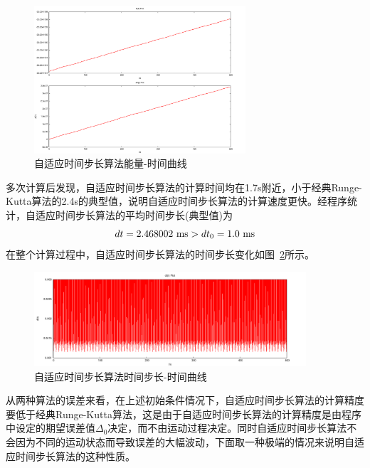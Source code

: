\documentclass[a4paper,12pt,titlepage]{article}
\begin{document}
\begin{figure}[H]
\centering
\includegraphics[width=0.7\textwidth]{./RKAE_3.pdf}
\caption[Caption for LOF]{自适应时间步长算法能量-时间曲线}
\label{fig:RKAE_3}
\end{figure}

多次计算后发现，自适应时间步长算法的计算时间均在1.7s附近，小于经典Runge-Kutta算法的2.4s的典型值，说明自适应时间步长算法的计算速度更快。经程序统计，自适应时间步长算法的平均时间步长(典型值)为
\begin{equation}
	dt=2.468002 ~\mathrm{ms} > dt_0=1.0 ~\mathrm{ms}\notag
\end{equation}
在整个计算过程中，自适应时间步长算法的时间步长变化如图~\ref{fig:RKAdt_3}所示。
\begin{figure}[H]
\centering
\includegraphics[width=0.9\textwidth]{./RKAdt_3.pdf}
\caption[Caption for LOF]{自适应时间步长算法时间步长-时间曲线}
\label{fig:RKAdt_3}
\end{figure}

从两种算法的误差来看，在上述初始条件情况下，自适应时间步长算法的计算精度要低于经典Runge-Kutta算法，这是由于自适应时间步长算法的计算精度是由程序中设定的期望误差值$\Delta_0$决定，而不由运动过程决定。同时自适应时间步长算法不会因为不同的运动状态而导致误差的大幅波动，下面取一种极端的情况来说明自适应时间步长算法的这种性质。
\end{document}
